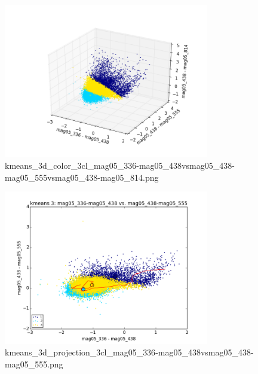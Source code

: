 \documentclass{article}%
\begin{document}
\begin{figure}%
\centering%
\includegraphics[width=0.8\textwidth]{kmeans_3d_color_3cl_mag05_336-mag05_438vsmag05_438-mag05_555vsmag05_438-mag05_814.png}%
\caption{kmeans\_3d\_color\_3cl\_mag05\_336{-}mag05\_438vsmag05\_438{-}mag05\_555vsmag05\_438{-}mag05\_814.png}%
\end{figure}

%


\begin{figure}%
\centering%
\includegraphics[width=0.8\textwidth]{kmeans_3d_projection_3cl_mag05_336-mag05_438vsmag05_438-mag05_555.png}%
\caption{kmeans\_3d\_projection\_3cl\_mag05\_336{-}mag05\_438vsmag05\_438{-}mag05\_555.png}%
\end{figure}

%
\end{document}
